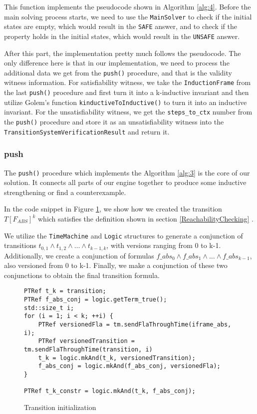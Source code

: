 This function implements the pseudocode shown in Algorithm \ref{alg:4}. Before the main solving process starts, we need to use the \texttt{MainSolver} to check if the initial states are empty, which would result in the \texttt{SAFE} answer, and to check if the property holds in the initial states, which would result in the \texttt{UNSAFE} answer.

After this part, the implementation pretty much follows the pseudocode. The only difference here is that in our implementation, we need to process the additional data we get from the \texttt{push()} procedure, and that is the validity witness information. For satisfiability witness, we take the \texttt{InductionFrame} from the last \texttt{push()} procedure and first turn it into a k-inductive invariant and then utilize Golem's function \texttt{kinductiveToInductive()} to turn it into an inductive invariant. For the unsatisfiability witness, we get the \texttt{steps\_to\_ctx} number from the \texttt{push()} procedure and store it as an unsatisfiability witness into the \texttt{TransitionSystemVerificationResult} and return it.

\subsubsection{push}

\noindent The \texttt{push()} procedure which implements the Algorithm \ref{alg:3} is the core of our solution. It connects all parts of our engine together to produce some inductive strengthening or find a counterexample.  


In the code snippet in Figure \ref{code:TransitionGen}, we show how we created the transition $T[F_{ABS}]^k$ which satisfies the definition shown in section \ref{ReachabilityChecking} .

We utilize the \texttt{TimeMachine} and \texttt{Logic} structures to generate a conjunction of transitions $t_{0,1} \wedge t_{1,2} \wedge \dots \wedge t_{k-1, k}$, with versions ranging from 0 to k-1. Additionally, we create a conjunction of formulas $f\_abs_0 \wedge f\_abs_1 \wedge \dots \wedge f\_abs_{k-1}$, also versioned from 0 to k-1. Finally, we make a conjunction of these two conjunctions to obtain the final transition formula.

\begin{figure}[H]
\begin{lstlisting}
PTRef t_k = transition;
PTRef f_abs_conj = logic.getTerm_true();
std::size_t i;
for (i = 1; i < k; ++i) {
    PTRef versionedFla = tm.sendFlaThroughTime(iframe_abs, i);
    PTRef versionedTransition = tm.sendFlaThroughTime(transition, i)
    t_k = logic.mkAnd(t_k, versionedTransition);
    f_abs_conj = logic.mkAnd(f_abs_conj, versionedFla);
}

PTRef t_k_constr = logic.mkAnd(t_k, f_abs_conj);
\end{lstlisting}
\caption{Transition initialization}\label{code:TransitionGen}
\end{figure}


